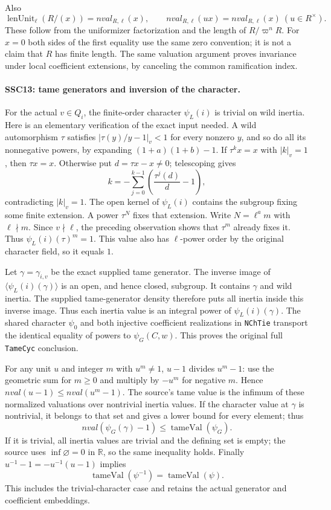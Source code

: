 \documentclass[11pt,a4paper]{article}
\numberwithin{equation}{section}
\theoremstyle{remark}\newtheorem{remark}[theorem]{Remark}
\begin{document}
Also
\[
 \operatorname{lenUnit}_{\ell}(R/(x))
       = nval_{R,\ell}(x),\qquad
 nval_{R,\ell}(ux)=nval_{R,\ell}(x)\ (u\in R^\times).         \tag{SSC.18}
\]
These follow from the uniformizer factorization and the length of
$R/\varpi^nR$. For $x=0$ both sides of the first equality use the
same zero convention; it is not a claim that $R$ has finite length.
The same valuation argument proves invariance under local
coefficient extensions, by canceling the common ramification index.

\paragraph{SSC13: tame generators and inversion of the character.}
\label{claim:SSC13}
For the actual $v\in Q_i$, the finite-order character $\psi_L(i)$
is trivial on wild inertia. Here is an elementary verification of
the exact input needed. A wild automorphism $\tau$ satisfies
$|\tau(y)/y-1|_v<1$ for every nonzero $y$, and so do all its
nonnegative powers, by expanding $(1+a)(1+b)-1$.
If $\tau^k x=x$ with $|k|_v=1$, then $\tau x=x$. Otherwise put
$d=\tau x-x\ne0$; telescoping gives
\[
 k=-\sum_{j=0}^{k-1}\left(\frac{\tau^j(d)}d-1\right),
\]
contradicting $|k|_v=1$. The open kernel of $\psi_L(i)$ contains
the subgroup fixing some finite extension. A power $\tau^N$
fixes that extension. Write $N=\ell^a m$ with $\ell\nmid m$.
Since $v\nmid\ell$, the preceding observation shows that
$\tau^m$ already fixes it. Thus $\psi_L(i)(\tau)^m=1$.
This value also has $\ell$-power order by the original character
field, so it equals $1$.

Let $\gamma=\gamma_{i,v}$ be the exact supplied tame generator.
The inverse image of $\langle\psi_L(i)(\gamma)\rangle$ is an open,
and hence closed, subgroup. It contains $\gamma$ and wild inertia.
The supplied tame-generator density therefore puts all inertia
inside this inverse image. Thus each inertia value is an integral
power of $\psi_L(i)(\gamma)$. The shared character $\psi_0$
and both injective coefficient realizations in \texttt{NCh\allowbreak Tie}
transport the identical equality of powers to $\psi_G(C,w)$.
This proves the original full \texttt{Tame\allowbreak Cyc} conclusion.

For any unit $u$ and integer $m$ with $u^m\ne1$, $u-1$ divides
$u^m-1$: use the geometric sum for $m\ge0$ and multiply by
$-u^m$ for negative $m$. Hence
$nval(u-1)\le nval(u^m-1)$. The source's tame value is the
infimum of these normalized valuations over nontrivial inertia
values. If the character value at $\gamma$ is nontrivial, it
belongs to that set and gives a lower bound for every element;
thus
\[
 nval(\psi_G(\gamma)-1)\le\operatorname{tameVal}(\psi_G).
                                                                    \tag{SSC.19}
\]
If it is trivial, all inertia values are trivial and the defining
set is empty; the source uses $\inf\varnothing=0$ in $\mathbb R$,
so the same inequality holds. Finally
$u^{-1}-1=-u^{-1}(u-1)$ implies
\[
           \operatorname{tameVal}(\psi^{-1})
                     =\operatorname{tameVal}(\psi).           \tag{SSC.20}
\]
This includes the trivial-character case and retains the actual
generator and coefficient embeddings.
\end{document}
